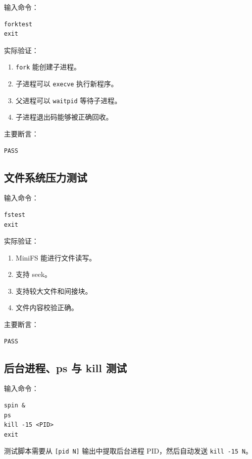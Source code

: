 \documentclass[UTF8,a4paper,12pt,openany,fontset=fandol]{ctexrep}
\begin{document}
输入命令：

\begin{lstlisting}
forktest
exit
\end{lstlisting}

实际验证：

\begin{enumerate}
\item \nolinkurl{fork} 能创建子进程。
\item 子进程可以 \nolinkurl{execve} 执行新程序。
\item 父进程可以 \nolinkurl{waitpid} 等待子进程。
\item 子进程退出码能够被正确回收。
\end{enumerate}

主要断言：

\begin{lstlisting}
PASS
\end{lstlisting}

\subsection{文件系统压力测试}

输入命令：

\begin{lstlisting}
fstest
exit
\end{lstlisting}

实际验证：

\begin{enumerate}
\item MiniFS 能进行文件读写。
\item 支持 seek。
\item 支持较大文件和间接块。
\item 文件内容校验正确。
\end{enumerate}

主要断言：

\begin{lstlisting}
PASS
\end{lstlisting}

\subsection{后台进程、ps 与 kill 测试}

输入命令：

\begin{lstlisting}
spin &
ps
kill -15 <PID>
exit
\end{lstlisting}

测试脚本需要从 \nolinkurl{[pid N]} 输出中提取后台进程 PID，然后自动发送 \nolinkurl{kill -15 N}。
\end{document}
